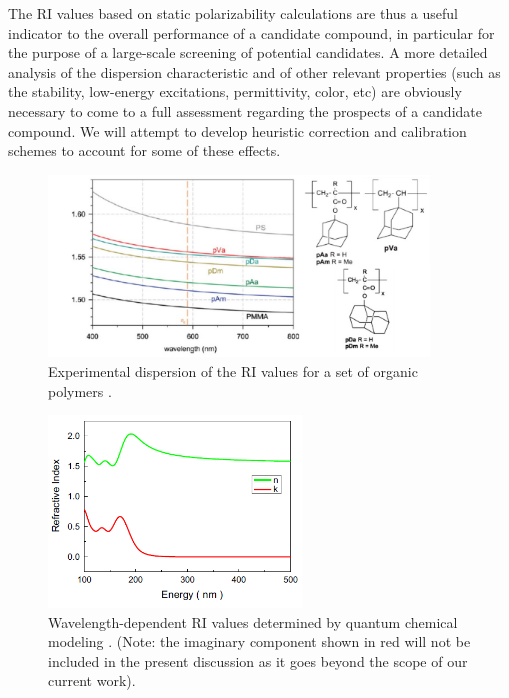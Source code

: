 The RI values based on static polarizability calculations are thus a useful indicator to the overall performance of a candidate compound, in particular for the purpose of a large-scale screening of potential candidates. A more detailed analysis of the dispersion characteristic and of other relevant properties (such as the stability, low-energy excitations, permittivity, color, etc) are obviously necessary to come to a full assessment regarding the prospects of a candidate compound. We will attempt to develop heuristic correction and calibration schemes to account for some of these effects. 

\begin{figure}[htbp] 
	\centering
	\includegraphics[width=0.9\textwidth]{Appendix-A/Figures/exp_RI_wl.jpg}
	\caption{Experimental dispersion of the RI values for a set of organic polymers \cite{Robello2013}.} 
	\label{fig:exp_RI_wl} 
\end{figure}  

\begin{figure}[htbp] 
	\centering
	\includegraphics[width=0.6\textwidth]{Appendix-A/Figures/calc_RI_wl.png}
	\caption{Wavelength-dependent RI values determined by quantum chemical modeling \cite{Rao2013}. (Note: the imaginary component shown in red will not be included in the present discussion as it goes beyond the scope of our current work).} 
	\label{fig:calc_RI_wl} 
\end{figure}  
